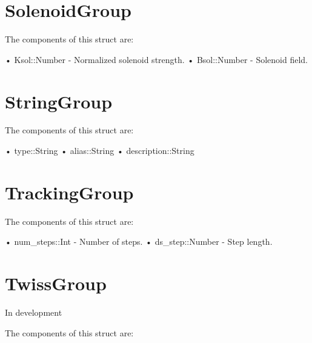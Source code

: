 \section{SolenoidGroup}
\label{s:solenoid.g}

The components of this struct are:
\begin{example}
• Ksol::Number        - Normalized solenoid strength.       
• Bsol::Number        - Solenoid field. 
\end{example}

\section{StringGroup}
\label{s:string.g}

The components of this struct are:
\begin{example}
• type::String 
• alias::String 
• description::String 
\end{example}

\section{TrackingGroup}
\label{s:tracking.g}

The components of this struct are:
\begin{example}
• num_steps::Int    - Number of steps. 
• ds_step::Number   - Step length. 
\end{example}

\section{TwissGroup}
\label{s:twiss.g}

In development

The components of this struct are:
\begin{example}
\end{example}
